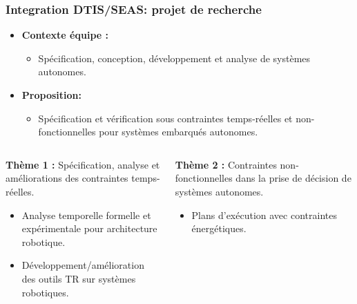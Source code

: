 \documentclass[xcolor=table]{beamer}
\begin{document}
\begin{frame}
	\frametitle{Integration DTIS/SEAS: projet de recherche}
	
	\begin{itemize}
		\item \textbf{Contexte équipe :}
		\begin{itemize}
			\item Spécification, conception, développement et analyse de systèmes autonomes.
		\end{itemize}
		\item \textbf{Proposition:}
		\begin{itemize}
			\item Spécification et vérification sous contraintes temps-réelles et non-fonctionnelles pour systèmes 
			embarqués autonomes.
		\end{itemize}
	\end{itemize}
	\begin{columns}
		\begin{column}{.45\textwidth}
			\textbf{Thème 1 :}  Spécification, analyse et améliorations des contraintes temps-réelles.
			\begin{itemize}
				\item Analyse temporelle formelle et expérimentale pour architecture robotique.
				\item Développement/amélioration des outils TR sur systèmes robotiques.
			\end{itemize}
		\end{column}
		\begin{column}{.45\textwidth}
			\textbf{Thème 2 :} Contraintes non-fonctionnelles dans la prise de décision de systèmes autonomes.
			\begin{itemize}
				\item Plans d'exécution avec contraintes énergétiques.
			\end{itemize}
		\end{column}
	\end{columns}
	
\end{frame}
\end{document}
